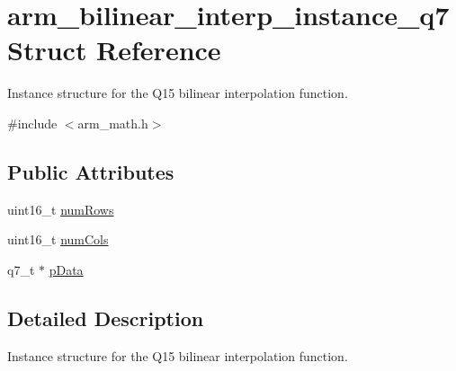 \hypertarget{structarm__bilinear__interp__instance__q7}{\section{arm\-\_\-bilinear\-\_\-interp\-\_\-instance\-\_\-q7 Struct Reference}
\label{structarm__bilinear__interp__instance__q7}
}


Instance structure for the Q15 bilinear interpolation function.  




{\ttfamily \#include $<$arm\-\_\-math.\-h$>$}

\subsection*{Public Attributes}
\begin{DoxyCompactItemize}
\item 
uint16\-\_\-t \hyperlink{structarm__bilinear__interp__instance__q7_ad5a8067cab5f9ea4688b11a623e16607}{num\-Rows}
\item 
uint16\-\_\-t \hyperlink{structarm__bilinear__interp__instance__q7_a860dd0d24380ea06cfbb348fb3b12c9a}{num\-Cols}
\item 
q7\-\_\-t $\ast$ \hyperlink{structarm__bilinear__interp__instance__q7_af05194d691bbefb02c34bafb22ca9ef0}{p\-Data}
\end{DoxyCompactItemize}


\subsection{Detailed Description}
Instance structure for the Q15 bilinear interpolation function. 

